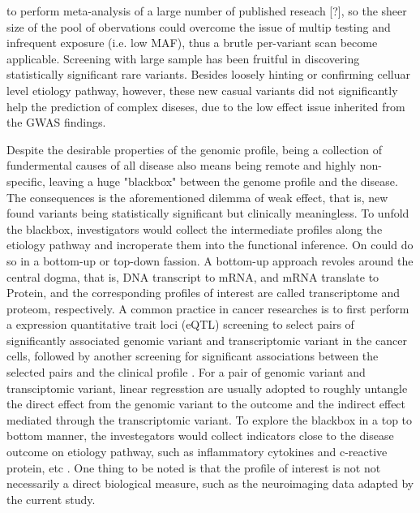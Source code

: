 \documentclass[twocolumn]{article}
\begin{document}
to perform meta-analysis of a large number of published reseach [?], so the sheer size of the pool of obervations could overcome the issue of multip testing and infrequent exposure (i.e. low MAF), thus a brutle per-variant scan become applicable. Screening with large sample has been fruitful in discovering statistically significant rare variants. Besides loosely hinting or confirming celluar level etiology pathway, however, these new casual variants did not significantly help the prediction of complex diseses, due to the low effect issue inherited from the GWAS findings.

Despite the desirable properties of the genomic profile, being a collection of fundermental causes of all disease also means being remote and highly non-specific, leaving a huge "blackbox" between the genome profile and the disease. The consequences is the aforementioned dilemma of weak effect, that is, new found variants being statistically significant but clinically meaningless. To unfold the blackbox, investigators would collect the intermediate profiles along the etiology pathway and incroperate them into the functional inference. On could do so in a bottom-up or top-down fassion. A bottom-up approach revoles around the central dogma, that is, DNA transcript to mRNA, and mRNA translate to Protein, and the corresponding profiles of interest are called transcriptome and proteom, respectively. A common practice in cancer researches is to first perform a expression quantitative trait loci (eQTL) \cite{eQTL1} screening to select pairs of significantly associated genomic variant and transcriptomic variant in the cancer cells, followed by another screening for significant associations between the selected pairs and the clinical profile \cite{eQTL2}. For a pair of genomic variant and transciptomic variant, linear regresstion are usually adopted to roughly untangle the direct effect from the genomic variant to the outcome and the indirect effect mediated through the transcriptomic variant. To explore the blackbox in a top to bottom manner, the investegators would collect indicators close to the disease outcome on etiology pathway, such as inflammatory cytokines and c-reactive protein, etc \cite{cytokine1, CRP1}. One thing to be noted is that the profile of interest is not  not necessarily a direct biological measure, such as the neuroimaging data adapted by the current study.
\end{document}
